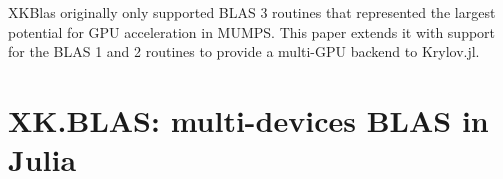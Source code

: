\documentclass{juliacon}
\newcommand{\todo}[1]{\textcolor{red}{\textbf{TODO:} #1}}
\begin{document}
XKBlas originally only supported BLAS 3 routines that represented the largest potential for GPU acceleration in MUMPS.
This paper extends it with support for the BLAS 1 and 2 routines to provide a multi-GPU backend to Krylov.jl.









\section{XK.BLAS: multi-devices BLAS in Julia} \label{sec:impl}
\end{document}
